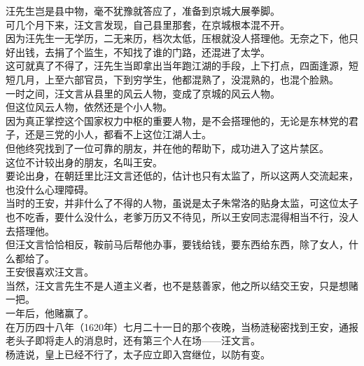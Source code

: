\begin{multicols}{\theparacolNo}
汪先生岂是县中物，毫不犹豫就答应了，准备到京城大展拳脚。\\

可几个月下来，汪文言发现，自己县里那套，在京城根本混不开。\\

因为汪先生一无学历，二无来历，档次太低，压根就没人搭理他。无奈之下，他只好出钱，去捐了个监生，不知找了谁的门路，还混进了太学。\\

这可就真了不得了，汪先生当即拿出当年跑江湖的手段，上下打点，四面逢源，短短几月，上至六部官员，下到穷学生，他都混熟了，没混熟的，也混个脸熟。\\

一时之间，汪文言从县里的风云人物，变成了京城的风云人物。\\

但这位风云人物，依然还是个小人物。\\

因为真正掌控这个国家权力中枢的重要人物，是不会搭理他的，无论是东林党的君子，还是三党的小人，都看不上这位江湖人士。\\

但他终究找到了一位可靠的朋友，并在他的帮助下，成功进入了这片禁区。\\

这位不计较出身的朋友，名叫王安。\\

要论出身，在朝廷里比汪文言还低的，估计也只有太监了，所以这两人交流起来，也没什么心理障碍。\\

当时的王安，并非什么了不得的人物，虽说是太子朱常洛的贴身太监，可这位太子也不吃香，要什么没什么，老爹万历又不待见，所以王安同志混得相当不行，没人去搭理他。\\

但汪文言恰恰相反，鞍前马后帮他办事，要钱给钱，要东西给东西，除了女人，什么都给了。\\

王安很喜欢汪文言。\\

当然，汪文言先生不是人道主义者，也不是慈善家，他之所以结交王安，只是想赌一把。\\

一年后，他赌赢了。\\

在万历四十八年（1620年）七月二十一日的那个夜晚，当杨涟秘密找到王安，通报老头子即将走人的消息时，还有第三个人在场——汪文言。\\

杨涟说，皇上已经不行了，太子应立即入宫继位，以防有变。\\


\end{multicols}
